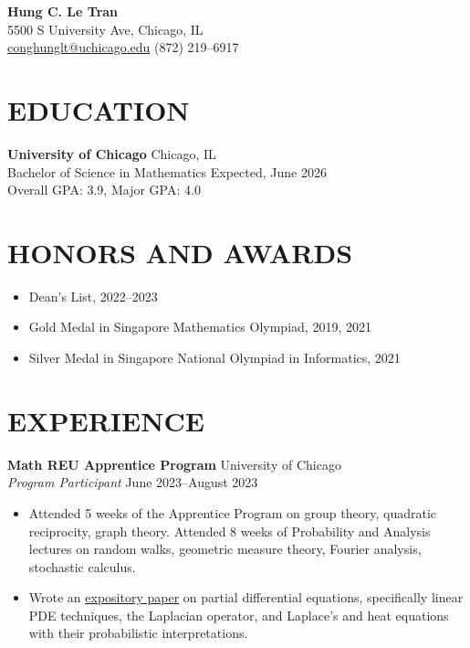 \documentclass[a4paper, 11pt]{extarticle}
\begin{document}
\pagestyle{empty}

\begin{center}
\textbf{\Large Hung C. Le Tran}\\
5500 S University Ave, Chicago, IL \\
\href{mailto:conghunglt@uchicago.edu}{conghunglt@uchicago.edu} \quad  (872) 219--6917
\end{center}

\section*{EDUCATION}
\noindent
\textbf{University of Chicago} \hfill Chicago, IL\\
Bachelor of Science in Mathematics \hfill Expected, June 2026\\
Overall GPA: 3.9, Major GPA: 4.0

\section*{HONORS AND AWARDS}
\begin{itemize}
    \item Dean's List, 2022--2023
    \item Gold Medal in Singapore Mathematics Olympiad, 2019, 2021
    \item Silver Medal in Singapore National Olympiad in Informatics, 2021
\end{itemize}

\section*{EXPERIENCE}
\textbf{Math REU Apprentice Program} \hfill University of Chicago \\
\textit{Program Participant} \hfill June 2023--August 2023
\begin{itemize}
    \item Attended 5 weeks of the Apprentice Program on group theory, quadratic reciprocity, graph theory. Attended 8 weeks of Probability and Analysis lectures on random walks, geometric measure theory, Fourier analysis, stochastic calculus.
    \item Wrote an \href{https://math.uchicago.edu/~may/REU2023/REUPapers/LeTran.pdf}{\underline{expository paper}} on partial differential equations, specifically linear PDE techniques, the Laplacian operator, and Laplace's and heat equations with their probabilistic interpretations.
\end{itemize}
\end{document}
